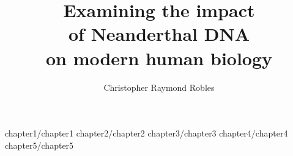 \documentclass [PhD] {uclathes}
\title          {Examining the impact \\
                of Neanderthal DNA \\
                on modern human biology}
\author         {Christopher Raymond Robles}
\begin{document}
\makeintropages

%
%
 {chapter1/chapter1}                         %
 {chapter2/chapter2}                         %
 {chapter3/chapter3}                         %
 {chapter4/chapter4}
 {chapter5/chapter5}
 \typeout{}


\end{document}
